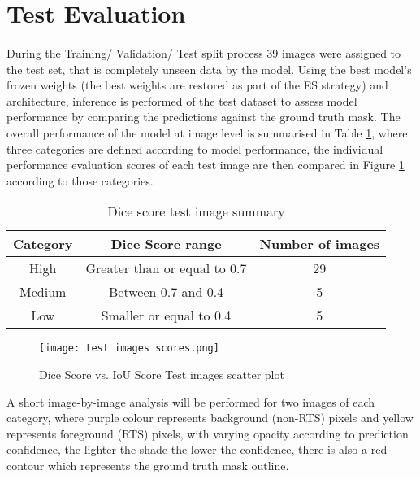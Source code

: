 \section{Test Evaluation}
\paragraph{}
During the Training/ Validation/ Test split process $39$ images were assigned to the test set, that is completely unseen data by the model. Using the best model's frozen weights (the best weights are restored as part of the \gls{ES} strategy) and architecture, inference is performed of the test dataset to assess model performance by comparing the predictions against the ground truth mask.
The overall performance of the model at image level is summarised in Table \ref{sum_test}, where three categories are defined according to model performance, the individual performance evaluation scores of each test image are then compared in Figure \ref{scatter_test_scores} according to those categories.
    \begin{table}[!h] 
        \begin{center}
        \begin{tabular}{ccc} 
        \toprule
        \textbf{Category} & \textbf{Dice Score range} & \textbf{Number of images} \\ \midrule
        High & Greater than or equal to 0.7 & 29  \\
        Medium & Between 0.7 and 0.4 & 5  \\
        Low & Smaller or equal to 0.4 & 5  \\
    \bottomrule
        \end{tabular}
      \end{center} 
      \caption{Dice score test image summary}\label{sum_test}
    \end{table}
    \begin{figure}[hbt!]
        \centering
        \texttt{[image: test images scores.png]}
        \caption{Dice Score vs. \gls{IoU} Score Test images scatter plot}
        \label{scatter_test_scores}
    \end{figure}

A short image-by-image analysis will be performed for two images of each category, where purple colour represents background (non-\gls{RTS}) pixels and yellow represents foreground (\gls{RTS}) pixels, with varying opacity according to prediction confidence, the lighter the shade the lower the confidence, there is also a red contour which represents the ground truth mask outline.

